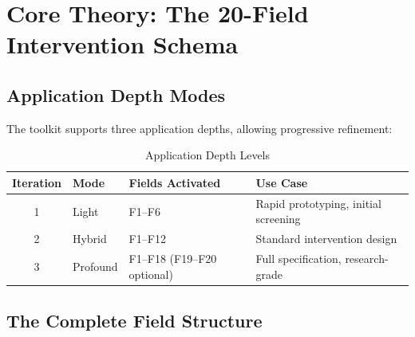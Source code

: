 \section{Core Theory: The 20-Field Intervention Schema}
\label{sec:hhh-theory}

\subsection{Application Depth Modes}

The toolkit supports three application depths, allowing progressive refinement:

\begin{table}[htbp]
\centering
\caption{Application Depth Levels}
\label{tab:hhh-depths}
\renewcommand{\arraystretch}{1.3}
\begin{tabular}{@{}clll@{}}
\toprule
\textbf{Iteration} & \textbf{Mode} & \textbf{Fields Activated} & \textbf{Use Case} \\
\midrule
1 & Light & F1--F6 & Rapid prototyping, initial screening \\
2 & Hybrid & F1--F12 & Standard intervention design \\
3 & Profound & F1--F18 (F19--F20 optional) & Full specification, research-grade \\
\bottomrule
\end{tabular}
\end{table}

\subsection{The Complete Field Structure}

